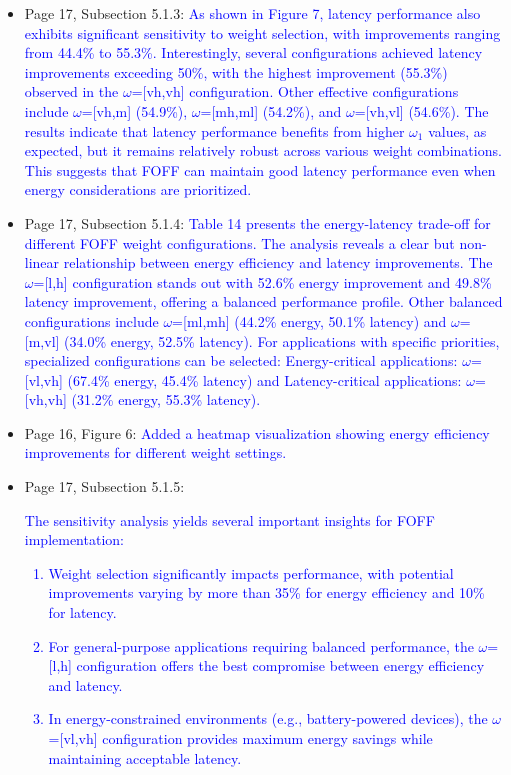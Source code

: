 \begin{itemize}
    \item Page 17, Subsection 5.1.3: \textcolor{blue}{As shown in Figure 7, latency performance also exhibits significant sensitivity to weight selection, with improvements ranging from 44.4\% to 55.3\%.  Interestingly, several configurations achieved latency improvements exceeding 50\%, with the highest improvement (55.3\%) observed in the $\omega$=[vh,vh] configuration. Other effective configurations include $\omega$=[vh,m] (54.9\%), $\omega$=[mh,ml] (54.2\%), and $\omega$=[vh,vl] (54.6\%). The results indicate that latency performance benefits from higher $\omega_1$ values, as expected, but it remains relatively robust across various weight combinations. This suggests that FOFF can maintain good latency performance even when energy considerations are prioritized.}
    \item Page 17, Subsection 5.1.4: \textcolor{blue}{Table 14 presents the energy-latency trade-off for different FOFF weight configurations. The analysis reveals a clear but non-linear relationship between energy efficiency and latency improvements. The $\omega$=[l,h] configuration stands out with 52.6\% energy improvement and 49.8\% latency improvement, offering a balanced performance profile. Other balanced configurations include $\omega$=[ml,mh] (44.2\% energy, 50.1\% latency) and $\omega$=[m,vl] (34.0\% energy, 52.5\% latency). For applications with specific priorities, specialized configurations can be selected: Energy-critical applications: $\omega$=[vl,vh] (67.4\% energy, 45.4\% latency) and Latency-critical applications: $\omega$=[vh,vh] (31.2\% energy, 55.3\% latency).}
    \item Page 16, Figure 6: \textcolor{blue}{Added a heatmap visualization showing energy efficiency improvements for different weight settings.}
    \item Page 17, Subsection 5.1.5: \textcolor{blue}{The sensitivity analysis yields several important insights for FOFF implementation: \begin{enumerate}
        \item Weight selection significantly impacts performance, with potential improvements varying by more than 35\% for energy efficiency and 10\% for latency.
        \item For general-purpose applications requiring balanced performance, the $\omega$=[l,h] configuration offers the best compromise between energy efficiency and latency.
        \item In energy-constrained environments (e.g., battery-powered devices), the $\omega$=[vl,vh] configuration provides maximum energy savings while maintaining acceptable latency.

\end{enumerate}}
\end{itemize}
